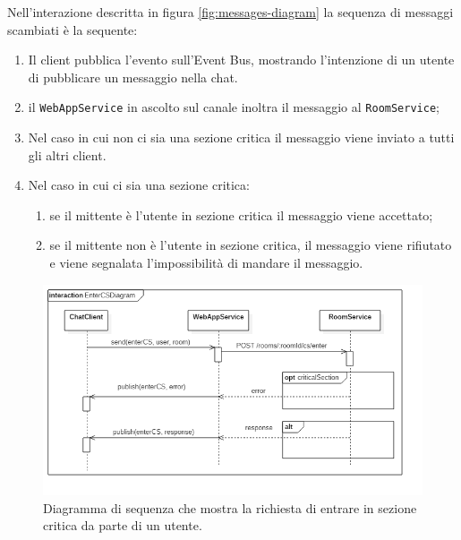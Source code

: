 \documentclass[a4paper]{article}
\begin{document}
Nell'interazione descritta in figura \ref{fig:messages-diagram} la sequenza di messaggi scambiati è la sequente:
\begin{enumerate}[label=(\arabic*)]
	\item Il client pubblica l'evento sull'Event Bus, mostrando l'intenzione di un utente di pubblicare un messaggio nella chat.
	\item il \texttt{WebAppService} in ascolto sul canale inoltra il messaggio al \texttt{RoomService}; 
	\item Nel caso in cui non ci sia una sezione critica il messaggio viene inviato a tutti gli altri client.
	\item Nel caso in cui ci sia una sezione critica:
	\begin{enumerate}
		\item se il mittente è l'utente in sezione critica il messaggio viene accettato;
		\item se il mittente non è l'utente in sezione critica, il messaggio viene rifiutato e viene segnalata l'impossibilità di mandare il messaggio.
	\end{enumerate}
\end{enumerate}

\begin{figure}[H]
    \centering
    \includegraphics[width=\linewidth, height=\textheight, keepaspectratio]{res/EnterCSDiagram.png}
        \caption{Diagramma di sequenza che mostra la richiesta di entrare in sezione critica da parte di un utente.}
    \label{fig:enterCS-diagram}
\end{figure}
\end{document}
